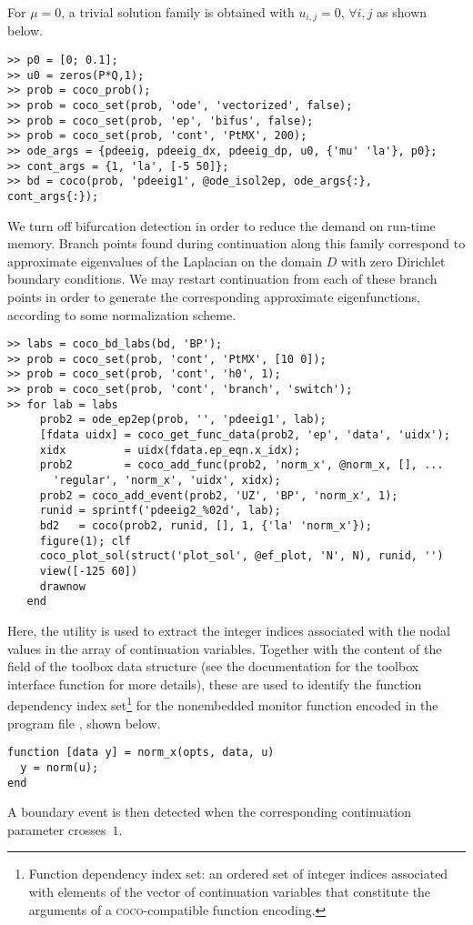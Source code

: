 For $\mu=0$, a trivial solution family is obtained with $u_{i,j}=0$, $\forall i,j$ as shown below. 
\begin{lstlisting}[language=coco-highlight]
>> p0 = [0; 0.1];
>> u0 = zeros(P*Q,1);
>> prob = coco_prob();
>> prob = coco_set(prob, 'ode', 'vectorized', false);
>> prob = coco_set(prob, 'ep', 'bifus', false);
>> prob = coco_set(prob, 'cont', 'PtMX', 200);
>> ode_args = {pdeeig, pdeeig_dx, pdeeig_dp, u0, {'mu' 'la'}, p0};
>> cont_args = {1, 'la', [-5 50]};
>> bd = coco(prob, 'pdeeig1', @ode_isol2ep, ode_args{:}, cont_args{:});
\end{lstlisting}
We turn off bifurcation detection in order to reduce the demand on run-time memory. Branch points found during continuation along this family correspond to approximate eigenvalues of the Laplacian on the domain $D$ with zero Dirichlet boundary conditions. We may restart continuation from each of these branch points in order to generate the corresponding approximate eigenfunctions, according to some normalization scheme.
\begin{lstlisting}[language=coco-highlight]
>> labs = coco_bd_labs(bd, 'BP');
>> prob = coco_set(prob, 'cont', 'PtMX', [10 0]);
>> prob = coco_set(prob, 'cont', 'h0', 1);
>> prob = coco_set(prob, 'cont', 'branch', 'switch');
>> for lab = labs
     prob2 = ode_ep2ep(prob, '', 'pdeeig1', lab);
     [fdata uidx] = coco_get_func_data(prob2, 'ep', 'data', 'uidx');
     xidx         = uidx(fdata.ep_eqn.x_idx);
     prob2        = coco_add_func(prob2, 'norm_x', @norm_x, [], ...
       'regular', 'norm_x', 'uidx', xidx);
     prob2 = coco_add_event(prob2, 'UZ', 'BP', 'norm_x', 1);
     runid = sprintf('pdeeig2_%02d', lab);
     bd2   = coco(prob2, runid, [], 1, {'la' 'norm_x'});
     figure(1); clf
     coco_plot_sol(struct('plot_sol', @ef_plot, 'N', N), runid, '')
     view([-125 60])
     drawnow
   end
\end{lstlisting}
Here, the  utility is used to extract the integer indices associated with the nodal values in the array of continuation variables. Together with the content of the  field of the  toolbox data structure (see the documentation for the  toolbox interface function for more details), these are used to identify the function dependency index set\footnote{Function dependency index set: an ordered set of integer indices associated with elements of the vector of continuation variables that constitute the arguments of a \textsc{coco}-compatible function encoding.} for the nonembedded monitor function  encoded in the program file , shown below. 
\begin{lstlisting}[language=coco-highlight]
function [data y] = norm_x(opts, data, u)
  y = norm(u);
end
\end{lstlisting}
A boundary event is then detected when the corresponding continuation parameter crosses~$1$.

